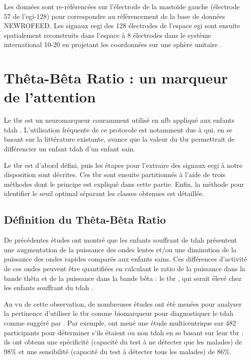 Les données sont re-référencées sur l'électrode de la mastoïde gauche (électrode 57 de l'\gls{egi}-128) pour correspondre au référencement de la base
de données NEWROFEED. Les signaux \gls{eegi} des 128 électrodes de l'espace \gls{egi} sont ensuite spatialement reconstruits dans l'espace à 8 électrodes 
dans le système international 10-20 en projetant les coordonnées sur une sphère unitaire \citep{Perrin1989}.


\section{Thêta-Bêta Ratio : un marqueur de l'attention}

Le \gls{tbr} est un neuromarqueur couramment utilisé en \gls{nfb} appliqué aux enfants \gls{tdah} \citep{Arns2013}. L'utilisation fréquente de ce protocole est notamment due
à \citet{Lubar1991} qui, en se basant sur la littérature existante, avance que la valeur du \gls{tbr} permettrait de différencier un enfant \gls{tdah} d'un enfant sain.  

Le \gls{tbr} est d'abord défini, puis les étapes pour l'extraire des
signaux \gls{eegi} à notre disposition sont décrites. Ces \gls{tbr} sont ensuite partitionnés à l'aide de trois méthodes dont le principe est expliqué dans cette partie. 
Enfin, la méthode pour identifier le seuil optimal séparant les classes obtenues est détaillée.

\subsection{Définition du Thêta-Bêta Ratio}
De précédentes études ont montré que les enfants souffrant de \gls{tdah} présentent une augmentation
de la puissance des ondes lentes et/ou une diminution de la puissance des ondes rapides
comparés aux enfants sains. Ces différences d'activité de ces 
ondes peuvent être quantifiées en calculant le ratio de la puissance dans la bande thêta et de la puissance dans la bande bêta : le 
\gls{tbr} \citep{Arns2013}, qui serait élevé chez les enfants souffrant du \gls{tdah} \citep{Lubar1991, Monastra1999, Barry2009, Snyder2006}. 

Au vu de cette observation, de nombreuses études ont été menées pour analyser la pertinence d'utiliser le \gls{tbr} comme biomarqueur pour 
diagnostiquer le \gls{tdah} comme suggéré par \citet{Lubar1991}. 
Par exemple, \citet{Monastra1999} ont mené une étude multicentrique sur 482 participants pour déterminer s'ils étaient ou non \gls{tdah} en se basant sur leur \gls{tbr} : 
ils ont obtenu une spécificité (capacité du test à ne détecter que les malades) de 98\% et une sensibilité (capacité du test à détecter tous les malades) de 86\%. 

